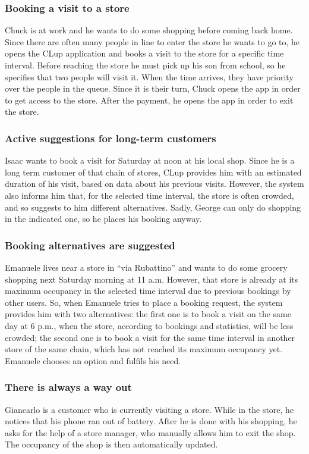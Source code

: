 \documentclass[a4paper,oneside,11pt]{book}   %
\begin{document}
        \subsubsection{Booking a visit to a store}
        Chuck is at work and he wants to do some shopping before coming back home. Since there are often many people in line to enter the store he wants to go to, he opens the CLup application and books a visit to the store for a specific time interval. Before reaching the store he must pick up his son from school, so he specifies that two people will visit it. When the time arrives, they have priority over the people in the queue. Since it is their turn, Chuck opens the app in order to get access to the store. After the payment, he opens the app in order to exit the store.
        \subsubsection{Active suggestions for long-term customers}
        Isaac wants to book a visit for Saturday at noon at his local shop. Since he is a long term customer of that chain of stores, CLup provides him with an estimated duration of his visit, based on data about his previous visits. However, the system also informs him that, for the selected time interval, the store is often crowded, and so suggests to him different alternatives. Sadly, George can only do shopping in the indicated one, so he places his booking anyway.
        \subsubsection{Booking alternatives are suggested}
        Emanuele lives near a store in “via Rubattino” and wants to do some grocery shopping next Saturday morning at 11 a.m. However, that store is already at its maximum occupancy in the selected time interval due to previous bookings by other users. So, when Emanuele tries to place a booking request, the system provides him with two alternatives: the first one is to book a visit on the same day at 6 p.m., when the store, according to bookings and statistics, will be less crowded; the second one is to book a visit for the same time interval in another store of the same chain, which has not reached its maximum occupancy yet. Emanuele chooses an option and fulfils his need. 
        \subsubsection{There is always a way out}
        Giancarlo is a customer who is currently visiting a store. While in the store, he notices that his phone ran out of battery. After he is done with his shopping, he asks for the help of a store manager, who manually allows him to exit the shop. The occupancy of the shop is then automatically updated.
\end{document}
